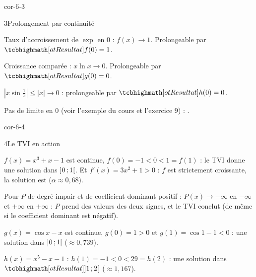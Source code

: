 \begin{blocLivre}{cor-6-3}
\begin{corrige}{3}{Prolongement par continuité}
\begin{questions}
  \item Taux d'accroissement de $\exp$ en $0$ : $f(x)\to1$. Prolongeable par
    $\res{f(0)=1}$.
  \item Croissance comparée : $x\ln x\to0$. Prolongeable par $\res{g(0)=0}$.
  \item $|x\sin\frac1x|\leq|x|\to0$ : prolongeable par $\res{h(0)=0}$.
  \item Pas de limite en $0$ (voir l'exemple du cours et l'exercice 9) :
    .
\end{questions}
\end{corrige}
\end{blocLivre}

\begin{blocLivre}{cor-6-4}
\begin{corrige}{4}{Le TVI en action}
\begin{questions}
  \item $f(x)=x^{3}+x-1$ est continue, $f(0)=-1<0<1=f(1)$ : le TVI donne
    une solution dans $\mathopen{]}0\,{;}\,1\mathclose{[}$. Et $f'(x)=3x^{2}+1>0$ : $f$ est
    strictement croissante, la solution est 
    ($\alpha\approx0{,}68$).
  \item Pour $P$ de degré impair et de coefficient dominant positif :
    $P(x)\to-\infty$ en $-\infty$ et $+\infty$ en $+\infty$ : $P$ prend des
    valeurs des deux signes, et le TVI conclut (de même si le coefficient
    dominant est négatif).
  \item $g(x)=\cos x-x$ est continue, $g(0)=1>0$ et $g(1)=\cos1-1<0$ :
    une solution dans $\mathopen{]}0\,{;}\,1\mathclose{[}$ ($\approx0{,}739$).
  \item $h(x)=x^{5}-x-1$ : $h(1)=-1<0<29=h(2)$ : une solution dans
    $\res{\intOO{1}{2}}$ ($\approx1{,}167$).
\end{questions}
\end{corrige}
\end{blocLivre}

